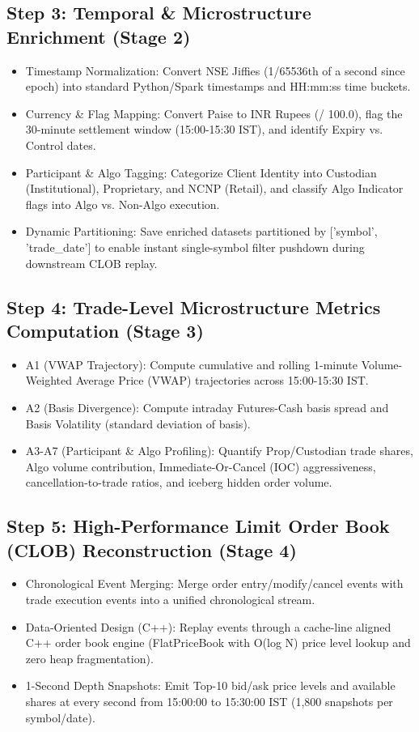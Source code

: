 \documentclass[11pt,a4paper]{article}
\begin{document}
\subsection*{Step 3: Temporal \& Microstructure Enrichment (Stage 2)}
\begin{itemize}[noitemsep,topsep=2pt]
  \item Timestamp Normalization: Convert NSE Jiffies (1/65536th of a second since epoch) into standard Python/Spark timestamps and HH:mm:ss time buckets.
  \item Currency \& Flag Mapping: Convert Paise to INR Rupees (/ 100.0), flag the 30-minute settlement window (15:00-15:30 IST), and identify Expiry vs. Control dates.
  \item Participant \& Algo Tagging: Categorize Client Identity into Custodian (Institutional), Proprietary, and NCNP (Retail), and classify Algo Indicator flags into Algo vs. Non-Algo execution.
  \item Dynamic Partitioning: Save enriched datasets partitioned by ['symbol', 'trade\_date'] to enable instant single-symbol filter pushdown during downstream CLOB replay.
\end{itemize}
\vspace{0.15cm}
\subsection*{Step 4: Trade-Level Microstructure Metrics Computation (Stage 3)}
\begin{itemize}[noitemsep,topsep=2pt]
  \item A1 (VWAP Trajectory): Compute cumulative and rolling 1-minute Volume-Weighted Average Price (VWAP) trajectories across 15:00-15:30 IST.
  \item A2 (Basis Divergence): Compute intraday Futures-Cash basis spread and Basis Volatility (standard deviation of basis).
  \item A3-A7 (Participant \& Algo Profiling): Quantify Prop/Custodian trade shares, Algo volume contribution, Immediate-Or-Cancel (IOC) aggressiveness, cancellation-to-trade ratios, and iceberg hidden order volume.
\end{itemize}
\vspace{0.15cm}
\subsection*{Step 5: High-Performance Limit Order Book (CLOB) Reconstruction (Stage 4)}
\begin{itemize}[noitemsep,topsep=2pt]
  \item Chronological Event Merging: Merge order entry/modify/cancel events with trade execution events into a unified chronological stream.
  \item Data-Oriented Design (C++): Replay events through a cache-line aligned C++ order book engine (FlatPriceBook with O(log N) price level lookup and zero heap fragmentation).
  \item 1-Second Depth Snapshots: Emit Top-10 bid/ask price levels and available shares at every second from 15:00:00 to 15:30:00 IST (1,800 snapshots per symbol/date).
\end{itemize}
\vspace{0.15cm}
\end{document}
